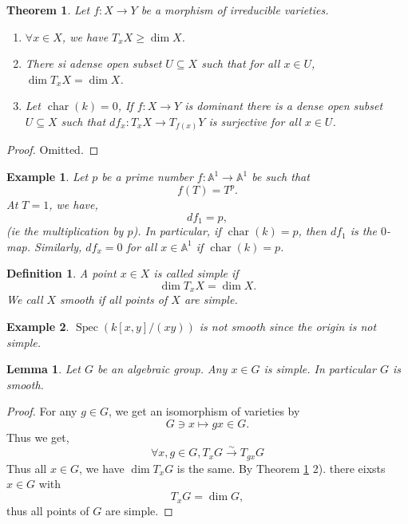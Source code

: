 \documentclass[10pt]{article}
\newtheorem{theorem}{Theorem} [section]
\newtheorem{definition}{Definition}[section]
\newtheorem{lemma}{Lemma}[section]
\newtheorem{example}{Example}[section]
\numberwithin{equation}{theorem}
\DeclareMathOperator{\chr}{char}
\DeclareMathOperator{\Spec}{Spec}
\newcommand{\A}[0]{\mathbb{A}}
\begin{document}
\begin{theorem}
  \label{theorem_5_8}
  Let $f:X\to Y$ be a morphism of irreducible varieties.
  \begin{enumerate}[1).]
    \item $\forall x\in X$, we have $T_xX\geq \dim X$.
    \item There si adense open subset $U\subseteq X$ such that for all $x\in U$, $\dim T_xX=\dim X$.
    \item Let $\chr(k) = 0$, If $f:X\to Y$ is dominant there is a dense open subset $U\subseteq X$ such that $df_x:T_xX\to T_{f(x)}Y$ is surjective for all $x\in U$.
  \end{enumerate}
\end{theorem}
\begin{proof}
  Omitted.
\end{proof}
\begin{example}
  \label{example_5_9}
  Let $p$ be a prime number $f:\A^1\to \A^1$ be such that 
  \begin{equation*}
    f(T) = T^p.
  \end{equation*}
  At $T=1$, we have,
  \begin{equation*}
    df_1 = p,
  \end{equation*}
  (ie the multiplication by $p$). In particular, if $\chr(k) = p$, then $df_1$ is the $0$-map. Similarly, $df_x=0$ for all $x\in \A^1$ if $\chr(k) = p$.
\end{example}
\begin{definition}
  \label{definition_5_10}A point $x\in X$ is called simple if 
  \begin{equation*}
    \dim T_xX = \dim X.
  \end{equation*}
  We call $X$ smooth if all points of $X$ are simple.
\end{definition}

\begin{example}
  $\Spec(k[x,y]/(xy))$ is not smooth since the origin is not simple.
\end{example}

\begin{lemma}
  \label{lemma_5_11}
  Let $G$ be an algebraic group. Any $x\in G$ is simple. In particular $G$ is smooth.
\end{lemma}
\begin{proof}
  For any $g\in G$, we get an isomorphism of varieties by 
  \begin{equation*}
    G\ni x\mapsto gx\in G.
  \end{equation*}
  Thus we get,
  \begin{equation*}
    \forall x,g\in G, T_xG\stackrel{\sim}{\to}T_{gx}G
  \end{equation*}
  Thus all $x\in G$, we have $\dim T_xG$ is the same. By Theorem \ref{theorem_5_8} 2). there eixsts $x\in G$ with 
  \begin{equation*}
    T_xG = \dim G,
  \end{equation*}
  thus all points of $G$ are simple.
\end{proof}
\end{document}
